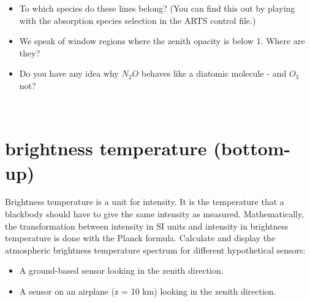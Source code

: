 \documentclass[paper=a4, fontsize=11pt]{scrartcl} %
\begin{document}
\begin{itemize}
	\item To which species do these lines belong? (You can find this out by playing with the absorption species selection in the ARTS control file.)

	\item We speak of window regions where the zenith opacity is below 1. Where are they?

	\item Do you have any idea why $N_{2}O$ behaves like a diatomic molecule - and $O_{3}$ not?

\end{itemize}

\ \\
\section{brightness temperature (bottom-up)}

Brightness temperature is a unit for intensity. It is the temperature that a blackbody should have to give the same intensity as measured. Mathematically, the transformation between intensity in SI units and intensity in brightness temperature is done with the Planck formula. Calculate and display the atmospheric brightness temperature spectrum for different hypothetical sensors:

\begin{itemize}
\item A ground-based sensor looking in the zenith direction.
\item A sensor on an airplane (z = 10 km) looking in the zenith direction. 
\end{itemize}
\end{document}
